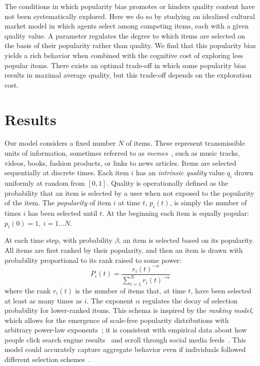 The conditions in which popularity bias promotes or hinders quality content have not been systematically explored. Here we do so by studying
an idealized cultural market model in which agents select among competing items, each with a given quality value.  
A parameter regulates the degree to which items are selected on the basis of their popularity rather than quality. 
We find that this popularity bias yields a rich behavior when combined with the cognitive cost of exploring less popular items. There exists an optimal trade-off in which some popularity bias results in maximal average quality, but this trade-off depends on the exploration cost.

\section*{Results}

Our model considers a fixed number $N$ of items. These represent transmissible units of information, sometimes referred to as \emph{memes}~\cite{dawkins1989selfish}, such as music tracks, videos, books, fashion products, or links to news articles. Items are selected sequentially at discrete times. Each item $i$ has an \emph{intrinsic quality} value $q_i$ drawn uniformly at random from $[0,1]$. Quality is operationally defined as the probability that an item is selected by a user when not exposed to the popularity of the item. The \emph{popularity} of item $i$ at time $t$, $p_i(t)$, is simply the number of times $i$ has been selected until $t$. At the beginning each item is equally popular: $p_i(0)=1,~i=1\ldots N$.

At each time step, with probability $\beta$, an item is selected based on its popularity. All items are first ranked by their popularity, and then an item is drawn with probability proportional to its rank raised to some power:
%
\begin{equation}
P_i(t) = \frac{r_i(t)^{-\alpha}}{\sum_{i=1}^N r_i(t)^{-\alpha}}
\label{eq:rankprob}
\end{equation}
%
where the rank $r_i(t)$ is the number of items that, at time $t$, have been selected at least as many times as $i$. The exponent $\alpha$ regulates the decay of selection probability for lower-ranked items. This schema is inspired by the \emph{ranking model}, which allows for the emergence of scale-free popularity distributions with arbitrary power-law exponents~\cite{fortunato2006scale}; it is consistent with empirical data about how people click search engine results~\cite{Fortunato22082006} and scroll through social media feeds~\cite{QiuNHB17}. 
%
This model could accurately capture aggregate  behavior even if individuals followed different selection schemes~\cite{estes1956problem}.

